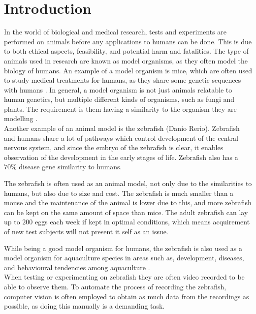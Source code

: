 \graphicspath{{figures/intro/}}
\chapter{Introduction}\label{ch:intro}
In the world of biological and medical research, tests and experiments are performed on animals before any applications to humans can be done. This is due to both ethical aspects, feasibility, and potential harm and fatalities. The type of animals used in research are known as model organisms, as they often model the biology of humans. An example of a model organism is mice, which are often used to study medical treatments for humans, as they share some genetic sequences with humans \citep{Perlman2016, RahmanKhan2018}. 
In general, a model organism is not just animals relatable to human genetics, but multiple different kinds of organisms, such as fungi and plants. The requirement is them having a similarity to the organism they are modelling \citep{Hedges2002}.\\

Another example of an animal model is the zebrafish (Danio Rerio). Zebrafish and humans share a lot of pathways which control development of the central nervous system, and since the embryo of the zebrafish is clear, it enables observation of the development in the early stages of life. Zebrafish also has a $70\%$ disease gene similarity to humans. 

The zebrafish is often used as an animal model, not only due to the similarities to humans, but also due to size and cost. The zebrafish is much smaller than a mouse and the maintenance of the animal is lower due to this, and more zebrafish can be kept on the same amount of space than mice.
The adult zebrafish can lay up to $200$ eggs each week if kept in optimal conditions, which means acquirement of new test subjects will not present it self as an issue.

While being a good model organism for humans, the zebrafish is also used as a model organism for aquaculture species in areas such as, development, diseases, and behavioural tendencies among aquaculture \citep{RahmanKhan2018}.\\ 

When testing or experimenting on zebrafish they are often video recorded to be able to observe them. To automate the process of recording the zebrafish, computer vision is often employed to obtain as much data from the recordings as possible, as doing this manually is a demanding task.

